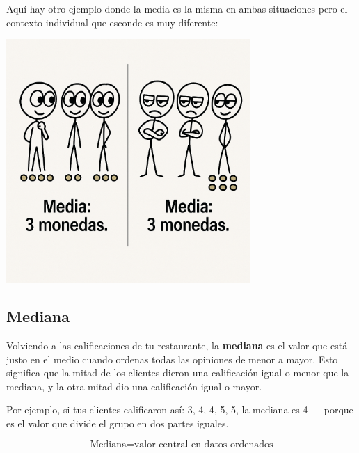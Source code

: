 \documentclass[
  spanish,
  letterpaper,
  DIV=11,
  numbers=noendperiod]{scrreprt}
\begin{document}
Aquí hay otro ejemplo donde la media es la misma en ambas situaciones
pero el contexto individual que esconde es muy diferente:

\begin{center}
\includegraphics[width=3.64583in,height=\textheight,keepaspectratio]{img/media_3.png}
\end{center}

\subsection{Mediana}\label{mediana}

Volviendo a las calificaciones de tu restaurante, la \textbf{mediana} es
el valor que está justo en el medio cuando ordenas todas las opiniones
de menor a mayor. Esto significa que la mitad de los clientes dieron una
calificación igual o menor que la mediana, y la otra mitad dio una
calificación igual o mayor.

Por ejemplo, si tus clientes calificaron así: 3, 4, 4, 5, 5, la mediana
es 4 --- porque es el valor que divide el grupo en dos partes iguales.

\begin{tcolorbox}[enhanced jigsaw, bottomrule=.15mm, colframe=quarto-callout-tip-color-frame, breakable, colback=white, leftrule=.75mm, left=2mm, arc=.35mm, toprule=.15mm, opacityback=0, rightrule=.15mm]
\begin{minipage}[t]{5.5mm}
\textcolor{quarto-callout-tip-color}{\faLightbulb}
\end{minipage}%
\begin{minipage}[t]{\textwidth - 5.5mm}

\[
\text{Mediana} = \text{valor central en datos ordenados}
\]

\end{minipage}%
\end{tcolorbox}
\end{document}
